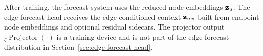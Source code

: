 After training, the forecast system uses the reduced node embeddings
$\pmb{\mathbf{z}}_{u}$.  The edge forecast head receives the edge-conditioned context
$\pmb{\mathbf{z}}_{u\,v}$ built from endpoint node embeddings and optional residual
sidecars.  The projector output ${}_{\zeta}\operatorname{Projector}(\cdot)$ is a
training device and is not part of the edge forecast distribution in
Section~\ref{sec:edge-forecast-head}.
